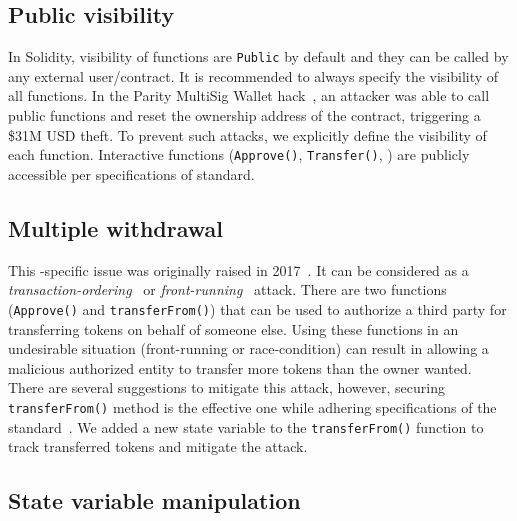\subsection{Public visibility}

In Solidity, visibility of functions are \texttt{Public} by default and they can be called by any external user/contract. It is recommended to always specify the visibility of all functions. In the Parity MultiSig Wallet hack~\cite{ParityFirstHack}, an attacker was able to call public functions and reset the ownership address of the contract, triggering a \$31M USD theft. To prevent such attacks, we explicitly define the visibility of each function. Interactive functions (\eg \texttt{Approve()}, \texttt{Transfer()}, \etc) are publicly accessible per specifications of \erc standard.

\subsection{Multiple withdrawal}

This \erc-specific issue was originally raised in 2017~\cite{MikVlad,TomHale}. It can be considered as a \textit{transaction-ordering}~\cite{OrderingAttack} or \textit{front-running}~\cite{eskandari2019sok} attack. There are two \erc functions (\ie \texttt{Approve()} and \texttt{transferFrom()}) that can be used to authorize a third party for transferring tokens on behalf of someone else. Using these functions  in an undesirable situation (\ie front-running or race-condition) can result in allowing a malicious authorized entity to transfer more tokens than the owner wanted. There are several suggestions to mitigate this attack, however, securing \texttt{transferFrom()} method is the effective one while adhering specifications of the \erc standard~\cite{ERC20MWA}. We added a new state variable to the \texttt{transferFrom()} function to track transferred tokens and mitigate the attack. 

\subsection{State variable manipulation}

